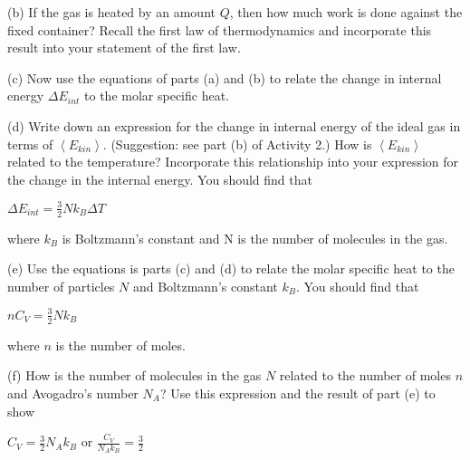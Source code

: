 (b) If the gas is heated by an amount \( Q \), then how much work is done
against the fixed container? Recall the first law of thermodynamics
and incorporate this result into your statement of the first law.
\vspace{1in}

(c) Now use the equations of parts (a) and (b) to relate the change
in internal energy \( \Delta E_{int} \) to the molar specific heat.
\vspace{1in}


(d) Write down an expression for  the change in internal
energy of the ideal gas in terms of \( \left\langle E_{kin}\right\rangle  \).
(Suggestion: see part (b) of Activity 2.)
How is \( \left\langle E_{kin}\right\rangle  \) related to the temperature?
Incorporate this relationship into your expression for the change
in the internal energy. You should find that

{\centering \( \Delta E_{int}=\frac{3}{2}Nk_{B}\Delta T \)\par}

where \( k_{B} \) is Boltzmann's constant and N is the number of
molecules in the gas.
\vspace{1in}

(e) Use the equations is parts (c) and (d) to relate the molar specific
heat to the number of particles \( N \) and Boltzmann's constant \( k_{B} \).
You should find that
\vspace{1in}

{\centering \( nC_{V}=\frac{3}{2}Nk_{B} \)\par}

where \( n \) is the number of moles.
\vspace{1.5in}

(f) How is the number of molecules in the gas \( N \) related to the number
of moles \( n \) and Avogadro's number \( N_{A} \)? Use this expression
and the result of part (e) to show

{\centering \( C_{V}=\frac{3}{2}N_{A}k_{B} \) or \( \frac{C_{V}}{N_{A}k_{B}}=\frac{3}{2} \)\par}
\vspace{1.5in}

